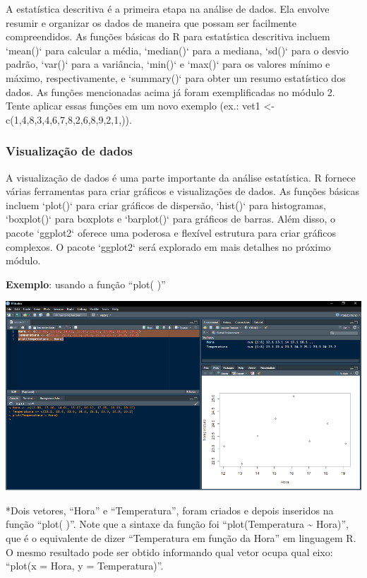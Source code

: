 \documentclass[
]{book}
\begin{document}
A estatística descritiva é a primeira etapa na análise de dados. Ela envolve resumir e organizar os dados de maneira que possam ser facilmente compreendidos. As funções básicas do R para estatística descritiva incluem `mean()` para calcular a média, `median()` para a mediana, `sd()` para o desvio padrão, `var()` para a variância, `min()` e `max()` para os valores mínimo e máximo, respectivamente, e `summary()` para obter um resumo estatístico dos dados. As funções mencionadas acima já foram exemplificadas no módulo 2. Tente aplicar essas funções em um novo exemplo (ex.: vet1 \textless- c(1,4,8,3,4,6,7,8,2,6,8,9,2,1,)).

\subsubsection{Visualização de dados}\label{visualizauxe7uxe3o-de-dados}

A visualização de dados é uma parte importante da análise estatística. R fornece várias ferramentas para criar gráficos e visualizações de dados. As funções básicas incluem `plot()` para criar gráficos de dispersão, `hist()` para histogramas, `boxplot()` para boxplots e `barplot()` para gráficos de barras. Além disso, o pacote `ggplot2` oferece uma poderosa e flexível estrutura para criar gráficos complexos. O pacote `ggplot2` será explorado em mais detalhes no próximo módulo.

\textbf{Exemplo}: usando a função ``plot( )''

\includegraphics{images/clipboard-3607661657.png}

*Dois vetores, ``Hora'' e ``Temperatura'', foram criados e depois inseridos na função ``plot( )''. Note que a sintaxe da função foi ``plot(Temperatura \textasciitilde{} Hora)'', que é o equivalente de dizer ``Temperatura em função da Hora'' em linguagem R. O mesmo resultado pode ser obtido informando qual vetor ocupa qual eixo: ``plot(x = Hora, y = Temperatura)''.
\end{document}
